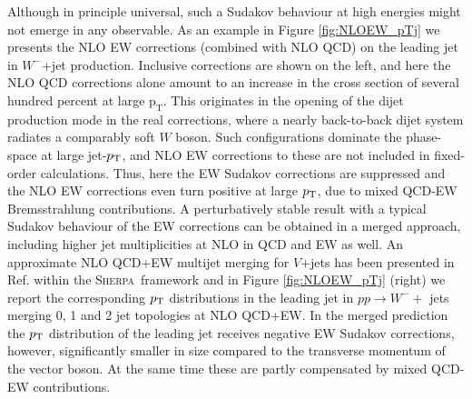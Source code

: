 \documentclass[a4paper,11pt,notoc]{article}
\newcommand{\pt}{\ensuremath{\mathrm{p_T}}}
\newcommand{\SHERPA}{\textsc{Sherpa}}
\begin{document}
Although in principle universal, such a Sudakov behaviour at high energies might
not emerge in any observable. As an example in Figure \ref{fig:NLOEW_pTj} we
presents the NLO EW corrections (combined with NLO QCD) on the leading jet in
$W^-$+jet production. Inclusive corrections are shown on the left, and here the NLO
QCD corrections alone amount to an increase in the cross section of several
hundred percent at large \pt. This originates in the opening of the dijet
production mode in the real corrections, where a nearly back-to-back dijet
system radiates a comparably soft $W$ boson. Such configurations dominate the
phase-space at large jet-$p_{\rm T}$, and NLO EW corrections to these are not included in fixed-order calculations. Thus, here the EW Sudakov
corrections are suppressed and the NLO EW corrections even turn positive at
large $p_{\rm T}$, due to mixed QCD-EW Bremsstrahlung contributions. A perturbatively stable result with
a typical Sudakov behaviour of the EW corrections can be obtained
in a merged approach, including higher jet multiplicities at NLO in QCD and EW as
well. An approximate NLO QCD+EW multijet merging for $V$+jets has been presented
in Ref. \cite{Kallweit:2015dum} within the \SHERPA\, framework and in Figure \ref{fig:NLOEW_pTj} (right) 
we report the corresponding $p_{\rm T}$ distributions in the leading jet in $p p \to W^- +$ jets
merging 0, 1 and 2 jet topologies at NLO QCD+EW.
In the merged prediction the $p_{\rm T}$ distribution of the leading jet receives negative EW Sudakov 
corrections, however, significantly smaller  in size compared to the transverse 
momentum of the vector boson. At the same time these
are partly compensated by mixed QCD-EW contributions.
\end{document}
